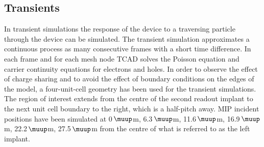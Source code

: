 \documentclass[a4paper,11pt]{article}
\begin{document}
\subsection{Transients}
\label{sec:tr}
In transient simulations the response of the device to a traversing particle through the device can be simulated. 
The transient simulation approximates a continuous process as many consecutive frames with a short time difference. 
In each frame and for each mesh node TCAD solves the Poisson equation and carrier continuity equations for electrons and holes.
In order to observe the effect of charge sharing and to avoid the effect of boundary conditions on the edges of the model, a four-unit-cell geometry has been used for the transient simulations. 
The region of interest extends from the centre of the second readout implant to the next unit cell boundary to the right, which is a half-pitch away.  
MIP incident positions have been simulated at 0\,$\muup$m, 6.3\,$\muup$m, 11.6\,$\muup$m, 16.9\,$\muup$m, 22.2\,$\muup$m, 27.5\,$\muup$m from the centre of what is referred to as the left implant.
\end{document}
